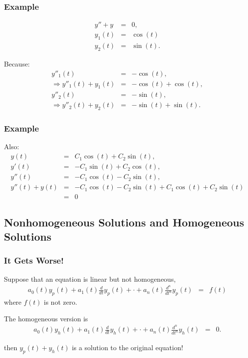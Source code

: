 \begin{frame}
  \frametitle{Example}

  \begin{eqnarray*}
    y'' + y & = & 0, \\
    y_1(t) & = & \cos(t) \\
    y_2(t) & = & \sin(t).
  \end{eqnarray*}

  Because:
  \begin{eqnarray*}
    y''_1(t) & = & -\cos(t), \\
    \Rightarrow y''_1(t) + y_1(t) & = & -\cos(t)+\cos(t), \\
    y''_2(t) & = & -\sin(t), \\
    \Rightarrow y''_2(t) + y_2(t) & = & -\sin(t)+\sin(t).
  \end{eqnarray*}

\end{frame}

\begin{frame}
  \frametitle{Example}

  Also:
  \begin{eqnarray*}
    y(t) & = & C_1 \cos(t) + C_2 \sin(t), \\
    y'(t) & = & -C_1 \sin(t) + C_2 \cos(t), \\
    y''(t) & = & -C_1 \cos(t) - C_2 \sin(t), \\
    y''(t) + y(t) & = & -C_1 \cos(t) - C_2 \sin(t) + C_1 \cos(t) + C_2 \sin(t) \\
    & = & 0
  \end{eqnarray*}


\end{frame}


\subsection{Nonhomogeneous Solutions and Homogeneous Solutions}


\begin{frame}
  \frametitle{It Gets Worse!}

  Suppose that an equation is linear but not homogeneous,
  \begin{eqnarray*}
    a_0(t) y_p(t) + a_1(t) \frac{d}{dt} y_p(t) + \cdot + a_n(t) \frac{d^n}{dt^n} y_p(t) & = & f(t)
  \end{eqnarray*}
  where $f(t)$ is not zero.

  The homogeneous version is 
  \begin{eqnarray*}
    a_0(t) y_h(t) + a_1(t) \frac{d}{dt} y_h(t) + \cdot + a_n(t) \frac{d^n}{dt^n} y_h(t) & = & 0.
  \end{eqnarray*}

  then $y_p(t)+y_h(t)$ is a solution to the original equation!


\end{frame}


